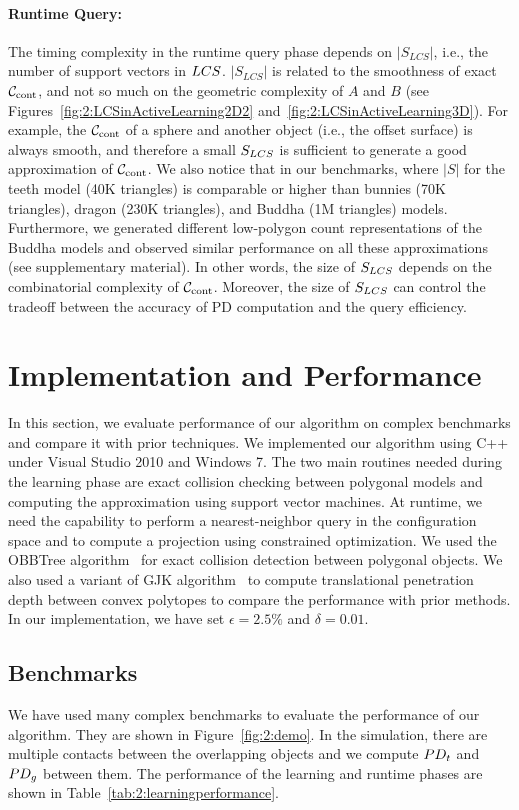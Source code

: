 \paragraph{Runtime Query:} The timing complexity in the runtime query
phase depends on $\left| S_{LCS} \right|$, i.e., the number of
support vectors in $LCS$. $\left| S_{LCS} \right|$ is related to
the smoothness of exact $\mathcal C_\text{cont}$, and not so much on the geometric complexity of $A$ and $B$ (see Figures~\ref{fig:2:LCSinActiveLearning2D2} and~\ref{fig:2:LCSinActiveLearning3D}).
For example, the $\mathcal C_\text{cont}$ of a sphere and another object (i.e., the offset surface) is always smooth, and
therefore a small $S_{LCS}$ is sufficient to generate a good approximation of $\mathcal C_\text{cont}$.
We also notice that in our benchmarks, where $|S|$ for the teeth model (40K triangles) is comparable or higher than bunnies (70K triangles), dragon (230K triangles), and Buddha (1M triangles) models. Furthermore, we generated different low-polygon count representations of the Buddha models and observed similar performance on all these approximations (see supplementary material).
In other words, the size of
$S_{LCS}$ depends on the combinatorial complexity of $\mathcal C_\text{cont}$. Moreover, the size of $S_{LCS}$
can control the tradeoff between the accuracy of PD
computation and the query efficiency.



\section{Implementation and Performance}
\label{sec:2:result}
In this section, we evaluate performance of our algorithm on complex benchmarks and compare it with prior techniques.
We implemented our algorithm using C++ under Visual Studio 2010
and Windows 7. The two main routines needed during the learning phase are exact collision checking between polygonal models and computing the approximation using support vector machines. At runtime, we need the capability to perform a nearest-neighbor query in the configuration space and to compute a projection using  constrained optimization. We used the OBBTree algorithm~\cite{Gottschalk:1996:OHS} for exact collision detection between polygonal objects.
We also used a variant of GJK algorithm~\cite{Gino:2001:GDC} to compute translational penetration depth between convex polytopes to compare the performance with prior methods. In our implementation, we have set $\epsilon=2.5\%$ and $\delta=0.01$.

\subsection{Benchmarks}
We have used many complex benchmarks to evaluate the performance of our algorithm. They are shown in Figure~\ref{fig:2:demo}. In the simulation, there are multiple contacts between the overlapping objects and we compute $PD_t$ and $PD_g$ between them. The performance of the  learning and runtime phases are shown in Table~\ref{tab:2:learningperformance}.

